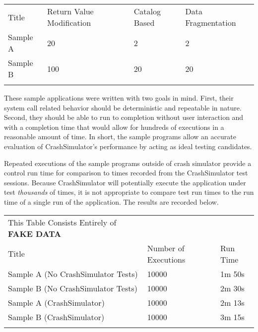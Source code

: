             \begin{table}[H]
                \scriptsize{}
                \begin{tabular}{l  l  l  l}
                    \toprule{}
                        Title & Return Value Modification & Catalog Based & Data Fragmentation \\
                        Sample A & 20 & 2 & 2 \\
                        Sample B & 100 & 20 & 20 \\
                    \bottomrule{}
                \end{tabular}
            \end{table}

            These sample applications were written with two goals in mind. First, their system call related behavior
            should be deterministic and repeatable in nature. Second, they should be able to run to completion without
            user interaction and with a completion time that would allow for hundreds of executions in a reasonable
            amount of time. In short, the sample programs allow an accurate evaluation of CrashSimulator's performance
            by acting as ideal testing candidates.

            Repeated executions of the sample programs outside of crash simulator provide a control run time for
            comparison to times recorded from the CrashSimulator test sessions. Because CrashSimulator will potentially
            execute the application under test \emph{thousands} of times, it is not appropriate to compare test run
            times to the run time of a single run of the application. The results are recorded below.

            \begin{table}[H]
                \scriptsize{}
                \begin{tabular} {l  l  l}
                    \toprule{}
                    This Table Consists Entirely of \textbf{FAKE DATA} \\
                    Title & Number of Executions & Run Time \\
                    Sample A (No CrashSimulator Tests) & 10000 & 1m 50s \\
                    Sample B (No CrashSimulator Tests) & 10000 & 2m 30s \\
                    Sample A (CrashSimulator) & 10000 & 2m 13s \\
                    Sample B (CrashSimulator) & 10000 & 3m 15s \\
                    \bottomrule{}
                \end{tabular}
            \end{table}

